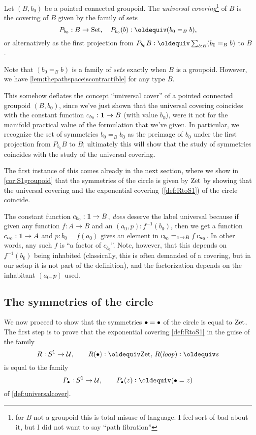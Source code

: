 \begin{definition}
  \label{def:universalcover}
  Let $(B,b_0)$ be a pointed connected groupoid.  
The \emph{universal covering}\footnote{for $B$ not a groupoid this is total misuse of language.  I feel sort of bad about it, but I did not want to say ``path fibration''} of $B$ is the covering of $B$ given by the family of sets 
  $$P_{b_0}:B\to\Set,\quad P_{b_0}(b)\defequi (b_0=_Bb),$$
or alternatively as the first projection from $P_{b_0}B\defequi\sum_{b:B}(b_0=_Bb)$ to $B$. 
\end{definition}
Note that $(b_0=_B b)$ is a family of \emph{sets} exactly when $B$ is a groupoid. 
However, we have \cref{lem:thepathspaceiscontractible} for any type $B$.

\begin{remark}
  This somehow deflates the concept ``universal cover'' of a pointed connected groupoid $(B,b_0)$, since we've just shown that the universal covering coincides with the constant function $c_{b_0}:\mathbf{1}\to B$ (with value $b_0$), were it not for the manifold practical value of the formulation that we've given.  
In particular, we recognize the set of symmetries $b_0=_Bb_0$ as the preimage of $b_0$ under the first projection from $P_{b_0}B$ to $B$; ultimately this will show that the study of symmetries coincides with the study of the universal covering.

The first instance of this comes already in the next section, where we show in \cref{cor:S1groupoid} that the symmetries of the circle is given by $\mathrm{Zet}$ by showing that the universal covering and the exponential covering (\cref{def:RtoS1}) of the circle coincide.
\end{remark}
\begin{remark}
  The constant function $c_{b_0}:\mathbf{1}\to B$, \emph{does} deserve the label universal because if given any function $f:A\to B$ and an $(a_0,p): f^{-1}(b_0)$, then we get a function $c_{a_0}:\mathbf{1}\to A$ and $p:b_0=f(a_0)$ gives an element in $c_{b_0}=_{\mathbf{1}\to B}f\, c_{a_0}$.  In other words, any such $f$ is ``a factor of $c_{b_0}$''.  
Note, however, that this depends on $f^{-1}(b_0)$ being inhabited (classically, this is often demanded of a covering, but in our setup it is not part of the definition), and the factorization depends on the inhabitant $(a_0,p)$ used. 
\end{remark}




\subsection{The symmetries of the circle}
\label{sec:symcirc}
We now proceed to show that the symmetries $\bullet=\bullet$ of the circle is equal to $\mathrm{Zet}$.  The first step is to prove that the exponential covering \cref{def:RtoS1} in the guise of the family 
$$R: \Sc\to\UU,\qquad R(\base)\defequi\zet,\, R(\Sloop)\defequi s$$
is equal to the family
$$P_\base:\Sc\to\UU,\qquad P_\base(z)\defequi (\base=z)$$
of \cref{def:universalcover}.

